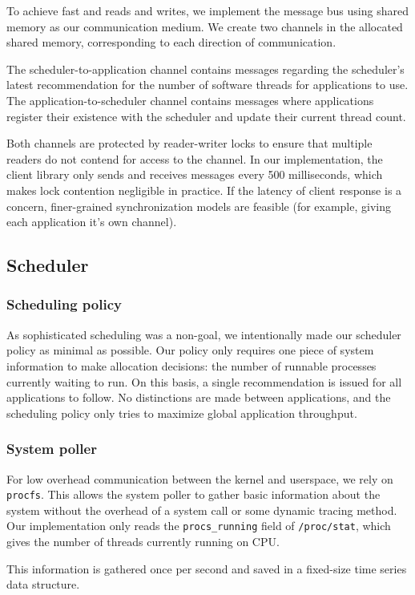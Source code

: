 To achieve fast and reads and writes, we implement the message bus using shared memory as our communication medium. We create two channels in the allocated shared memory, corresponding to each direction of communication.

The scheduler-to-application channel contains messages regarding the scheduler's latest recommendation for the number of software threads for applications to use. The application-to-scheduler channel contains messages where applications register their existence with the scheduler and update their current thread count.

Both channels are protected by reader-writer locks to ensure that multiple readers do not contend for access to the channel. In our implementation, the client library only sends and receives messages every 500 milliseconds, which makes lock contention negligible in practice. If the latency of client response is a concern, finer-grained synchronization models are feasible (for example, giving each application it's own channel).

\subsection{Scheduler}
\subsubsection{Scheduling policy}
As sophisticated scheduling was a non-goal, we intentionally made our scheduler policy as minimal as possible. Our policy only requires one piece of system information to make allocation decisions: the number of runnable processes currently waiting to run. On this basis, a single recommendation is issued for all applications to follow. No distinctions are made between applications, and the scheduling policy only tries to maximize global application throughput.

\subsubsection{System poller}
For low overhead communication between the kernel and userspace, we rely on \texttt{procfs}. This allows the system poller to gather basic information about the system without the overhead of a system call or some dynamic tracing method. Our implementation only reads the \texttt{procs\_running} field of \texttt{/proc/stat}, which gives the number of threads currently running on CPU.

This information is gathered once per second and saved in a fixed-size time series data structure.

